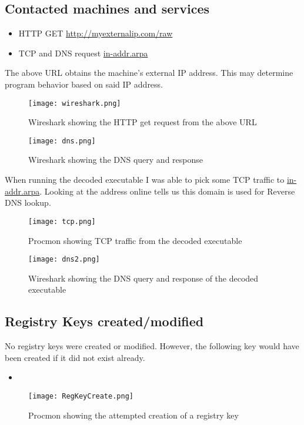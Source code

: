 \documentclass{article}
\begin{document}
    \subsection{Contacted machines and services}
    \begin{itemize}
        \item HTTP GET \url{http://myexternalip.com/raw}
        \item TCP and DNS request \url{in-addr.arpa}
    \end{itemize}
    The above URL obtains the machine's external IP address. This may determine program behavior based on said IP address.
    \begin{figure}[H]
        \texttt{[image: wireshark.png]}
        \caption{Wireshark showing the HTTP get request from the above URL }
    \end{figure}
    \begin{figure}[H]
        \texttt{[image: dns.png]}
        \label{dns}
        \caption{Wireshark showing the DNS query and response }
    \end{figure}
    When running the decoded executable I was able to pick some TCP traffic to \url{in-addr.arpa}. Looking at the address online tells us this domain is used for Reverse DNS lookup\cite{rDNS}.
    \begin{figure}[H]
        \texttt{[image: tcp.png]}
        \label{dns}
        \caption{Procmon showing TCP traffic from the decoded executable}
    \end{figure}
    \begin{figure}[H]
        \texttt{[image: dns2.png]}
        \label{dns}
        \caption{Wireshark showing the DNS query and response of the decoded executable}
    \end{figure}

    \subsection{Registry Keys created/modified}
    No registry keys were created or modified. However, the following key would have been created if it did not exist already.
    \begin{itemize}
        \item {}
    \end{itemize}
    \begin{figure}[H]
        \texttt{[image: RegKeyCreate.png]}
        \caption{Procmon showing the attempted creation of a registry key}
    \end{figure}
\end{document}
